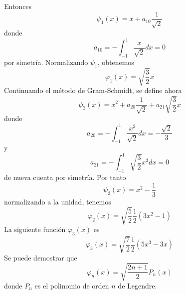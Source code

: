 Entonces
\begin{equation}
\psi_{1}(x) = x + a_{10} \dfrac{1}{\sqrt{2}}
\label{eq:ecuacion_50}
\end{equation}
donde
\begin{equation}
a_{10} = - \int_{-1}^{1} \dfrac{x}{\sqrt{2}} dx = 0
\label{eq:ecuacion_51}
\end{equation}
por simetría. Normalizando $\psi_{1}$, obtenemos
\begin{equation}
\varphi_{1}(x) = \sqrt{\dfrac{3}{2}} x
\label{eq:ecuacion_52}
\end{equation}
Continuando el método de Gram-Schmidt, se define ahora
\begin{equation}
\psi_{2} (x) = x^{2} +  a_{20} \dfrac{1}{\sqrt{2}} +  a_{21} \sqrt{\dfrac{3}{2}} x
\label{eq:ecuacion_53}
\end{equation}
donde
\begin{equation}
a_{20} = - \int_{-1}^{1} \dfrac{x^{2}}{\sqrt{2}} dx = - \dfrac{\sqrt{2}}{3}
\label{eq:ecuacion_54}
\end{equation}
y
\begin{equation}
a_{21} = - \int_{-1}^{1} \sqrt{\dfrac{3}{2}} x^{3} dx = 0
\label{eq:ecuacion_55}
\end{equation}
de nueva cuenta por simetría. Por tanto
\begin{equation}
\psi_{2}(x) = x^{2} - \dfrac{1}{3}
\label{eq:ecuacion_56}
\end{equation}
normalizando a la unidad, tenemos
\begin{equation}
\varphi_{2} (x) = \sqrt{\dfrac{5}{2}} \dfrac{1}{2} (3 x^{2} - 1)
\label{eq:ecuacion_57}
\end{equation}
La siguiente función $\varphi_{3}(x)$ es
\begin{equation}
\varphi_{3} (x) = \sqrt{\dfrac{7}{2}} \dfrac{1}{2} (5 x^{3} - 3x)
\label{eq:ecuacion_58}
\end{equation}
Se puede demostrar que
\begin{equation}
\varphi_{n}(x) = \sqrt{\dfrac{2n+1}{2}} P_{n}(x)
\label{eq:ecuacion_59}
\end{equation}
donde $P_{n}$ es el polinomio de orden $n$ de Legendre.
